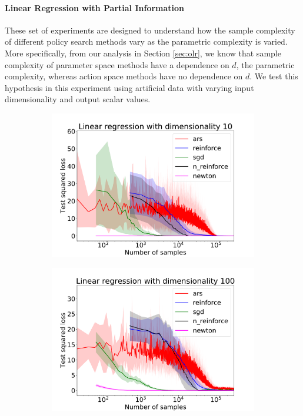 %
%

\paragraph{Linear Regression with Partial Information} These set of experiments are designed to understand how the sample
complexity of different policy search methods vary as the parametric
complexity is varied. More specifically, from our analysis in Section \ref{sec:olr}, we know
that sample complexity of parameter space methods have a dependence on
$d$, the parametric complexity, whereas action space methods have no
dependence on $d$. We test this hypothesis in this experiment using artificial data
with varying input dimensionality and output scalar values.
%
%
%
%
%
%
\begin{figure}[t]
  \centering
  \begin{subfigure}{0.32\linewidth}
    \includegraphics[width=\linewidth]{figures/aistats19/lin_10_all_log.pdf}\label{fig:lin10}
\end{subfigure}
\begin{subfigure}{0.32\linewidth}
  \includegraphics[width=\linewidth]{figures/aistats19/lin_100_all_log.pdf}\label{fig:lin100}

\end{subfigure}
\end{figure}
